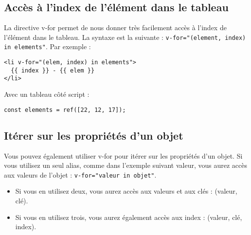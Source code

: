 \subsection{Accès à l'index de l'élément dans le tableau}
La directive {\color{monOrange}v-for} permet de nous donner très facilement accès à l'index de l'élément dans le tableau. La syntaxe est la suivante : {\tt v-for="(element, index) in elements"}. Par exemple :
\begin{verbatim}
<li v-for="(elem, index) in elements">
  {{ index }} - {{ elem }}
</li>
\end{verbatim}
Avec un tableau côté script :
\begin{verbatim}
const elements = ref([22, 12, 17]);
\end{verbatim}

\subsection{Itérer sur les propriétés d'un objet}
Vous pouvez également utiliser {\color{monOrange}v-for} pour itérer sur les propriétés d'un objet. Si vous utilisez un seul alias, comme dans l'exemple suivant {\color{monOrange}valeur}, vous aurez accès aux valeurs de l'objet : {\tt v-for="valeur in objet"}.
\begin{itemize}
\item Si vous en utilisez deux, vous aurez accès aux valeurs et aux clés : {\color{monOrange}(valeur, clé)}.
\item Si vous en utilisez trois, vous aurez également accès aux index : {\color{monOrange}(valeur, clé, index)}.
\end{itemize}

